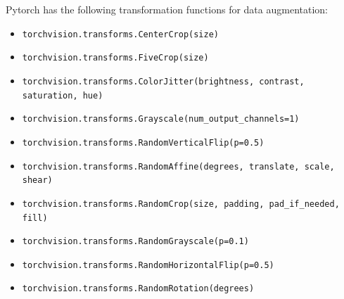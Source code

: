     Pytorch has the following transformation functions for data augmentation:
    \begin{itemize}
        \item \texttt{torchvision.transforms.CenterCrop(size)}
        \item \texttt{torchvision.transforms.FiveCrop(size)}
        \item \texttt{torchvision.transforms.ColorJitter(brightness, contrast, saturation, hue)}
        \item \texttt{torchvision.transforms.Grayscale(num\_output\_channels=1)}
        \item \texttt{torchvision.transforms.RandomVerticalFlip(p=0.5)}
        \item \texttt{torchvision.transforms.RandomAffine(degrees, translate, scale, shear)}
        \item \texttt{torchvision.transforms.RandomCrop(size, padding, pad\_if\_needed, fill)}
        \item \texttt{torchvision.transforms.RandomGrayscale(p=0.1)}
        \item \texttt{torchvision.transforms.RandomHorizontalFlip(p=0.5)}
        \item \texttt{torchvision.transforms.RandomRotation(degrees)}
    \end{itemize}

